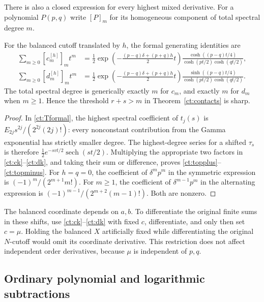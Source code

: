 There is also a closed expression for every highest mixed derivative.
For a polynomial $P(p,q)$ write $[P]_m$ for its homogeneous component of
total spectral degree $m$.

\begin{theorem}\label{ct:top}
For the balanced cutoff translated by $h$, the formal generating identities
are
\begin{align}
 \sum_{m\ge0}[c_m^{[h]}]_m t^m
 &=\frac12\exp\left(-\frac{(p-q)\delta+(p+q)h}{2}t\right)
 \frac{\cosh((p-q)t/4)}{\cosh(pt/2)\cosh(qt/2)},\label{ct:topplus}\\
 \sum_{m\ge0}[d_m^{[h]}]_m t^m
 &=\frac12\exp\left(-\frac{(p-q)\delta+(p+q)h}{2}t\right)
 \frac{\sinh((p-q)t/4)}{\cosh(pt/2)\cosh(qt/2)}.\label{ct:topminus}
\end{align}
The total spectral degree is generically exactly $m$ for $c_m$, and
exactly $m$ for $d_m$ when $m\ge1$. Hence the threshold $r+s>m$ in
Theorem~\ref{ct:contacts} is sharp.
\end{theorem}
\begin{proof}
In \eqref{ct:Tformal}, the highest spectral coefficient of $t_j(s)$ is
$E_{2j}s^{2j}/(2^{2j}(2j)!)$: every nonconstant contribution from the
Gamma exponential has strictly smaller degree. The highest-degree
series for a shifted $\tau_s$ is therefore
$\tfrac12 e^{-svt/2}\operatorname{sech}(st/2)$. Multiplying the
appropriate two factors in \eqref{ct:ck}--\eqref{ct:dk}, and taking
their sum or difference, proves \eqref{ct:topplus}--\eqref{ct:topminus}.
For $h=q=0$, the coefficient of $\delta^mp^m$ in the symmetric
expression is $(-1)^m/(2^{m+1}m!)$. For $m\ge1$, the coefficient
of $\delta^{m-1}p^m$ in the alternating expression is
$(-1)^{m-1}/(2^{m+2}(m-1)!)$. Both are nonzero.
\end{proof}

The balanced coordinate depends on $a,b$. To differentiate the original
finite sums in these shifts, use \eqref{ct:ck}--\eqref{ct:dk} with fixed
$c$, differentiate, and only then set $c=\mu$. Holding the balanced $X$
artificially fixed while differentiating the original $N$-cutoff would
omit its coordinate derivative. This restriction does not affect
independent order derivatives, because $\mu$ is independent of $p,q$.

\subsection{Ordinary polynomial and logarithmic subtractions}

